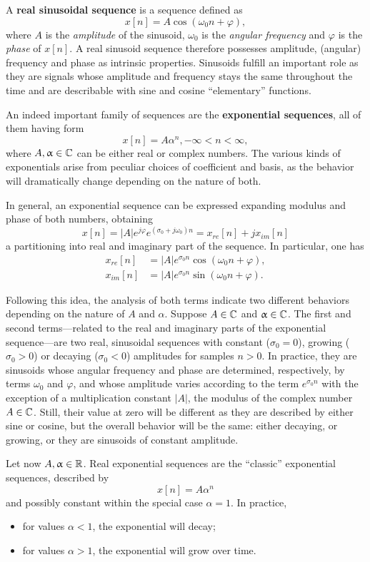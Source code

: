 \documentclass[\documentfontsize, twocolumn]{\classname}
\begin{document}
A \textbf{real sinusoidal se\-quen\-ce} is a se\-quen\-ce defined as \[x[n] = A\cos{(\omega_0 n + \varphi)},\] where $A$ is the \emph{amplitude} of the sinusoid, $\omega_0$ is the \emph{angular frequency} and $\varphi$ is the \emph{phase} of $x[n]$. A real sinusoid se\-quen\-ce therefore possesses amplitude, (angular) frequency and phase as intrinsic properties. Sinusoids fulfill an important role as they are signals whose amplitude and frequency stays the same throughout the time and are describable with sine and cosine ``elementary'' functions.

An indeed important family of se\-quen\-ces are the \textbf{exponential se\-quen\-ces}, all of them having form \[x[n] = A\alpha^n, -\infty < n < \infty,\] where $A, \upalpha \in \mathbb C$ can be either real or complex numbers. The various kinds of exponentials arise from peculiar choices of coefficient and basis, as the behavior will dramatically change depending on the nature of both.

In general, an exponential se\-quen\-ce can be expressed expanding modulus and phase of both numbers, obtaining \[x[n] = |A|e^{j\varphi}e^{(\sigma_0 + j\omega_0)n} = x_{re}[n] + jx_{im}[n]\] a partitioning into real and imaginary part of the se\-quen\-ce. In particular, one has 
\begin{align} 
    x_{re}[n] & = |A|e^{\sigma_0n}\cos{(\omega_0 n + \varphi)},\\
    x_{im}[n] & = |A|e^{\sigma_0n}\sin{(\omega_0 n + \varphi)}.
\end{align}

Following this idea, the analysis of both terms indicate two different behaviors depending on the nature of $A$ and $\alpha$. Suppose $A \in \mathbb C$ and $\upalpha \in \mathbb C$. The first and second terms---related to the real and imaginary parts of the exponential se\-quen\-ce---are two real, sinusoidal se\-quen\-ces with constant ($\sigma_0 = 0$), growing ($\sigma_0 > 0$) or decaying ($\sigma_0 < 0$) amplitudes for samples $n > 0$. In practice, they are sinusoids whose angular frequency and phase are determined, respectively, by terms $\omega_0$ and $\varphi$, and whose amplitude varies according to the term $e^{\sigma_0n}$ with the exception of a multiplication constant $|A|$, the modulus of the complex number $A \in \mathbb C$. Still, their value at zero will be different as they are described by either sine or cosine, but the overall behavior will be the same: either decaying, or growing, or they are sinusoids of constant amplitude.

Let now $A,\upalpha \in \mathbb R$. Real exponential se\-quen\-ces are the ``classic'' exponential se\-quen\-ces, described by \[x[n] = A\alpha^n\] and possibly constant within the special case $\alpha=1$. In practice,
\begin{itemize}
    \item for values $\alpha < 1$, the exponential will decay;
    \item for values $\alpha > 1$, the exponential will grow over time.
\end{itemize}
\end{document}

